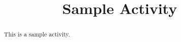 \documentclass{ximera}
\title{Sample Activity}
\begin{document}
\begin{abstract}
This is a sample activity.
\end{abstract}

\maketitle
\end{document}
